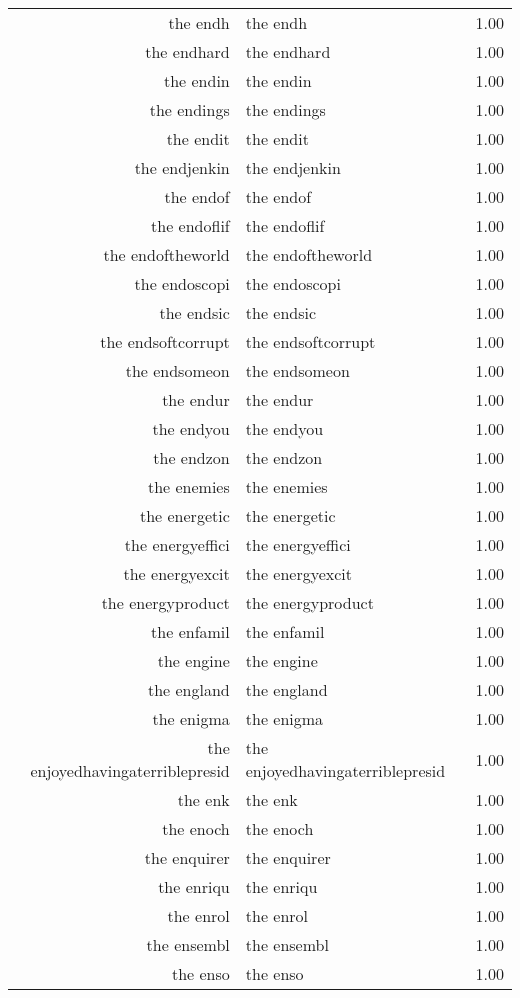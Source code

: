 \begin{table}[ht]
\begin{tabular}{rlr}
  the endh & the endh & 1.00 \\ 
  the endhard & the endhard & 1.00 \\ 
  the endin & the endin & 1.00 \\ 
  the endings & the endings & 1.00 \\ 
  the endit & the endit & 1.00 \\ 
  the endjenkin & the endjenkin & 1.00 \\ 
  the endof & the endof & 1.00 \\ 
  the endoflif & the endoflif & 1.00 \\ 
  the endoftheworld & the endoftheworld & 1.00 \\ 
  the endoscopi & the endoscopi & 1.00 \\ 
  the endsic & the endsic & 1.00 \\ 
  the endsoftcorrupt & the endsoftcorrupt & 1.00 \\ 
  the endsomeon & the endsomeon & 1.00 \\ 
  the endur & the endur & 1.00 \\ 
  the endyou & the endyou & 1.00 \\ 
  the endzon & the endzon & 1.00 \\ 
  the enemies & the enemies & 1.00 \\ 
  the energetic & the energetic & 1.00 \\ 
  the energyeffici & the energyeffici & 1.00 \\ 
  the energyexcit & the energyexcit & 1.00 \\ 
  the energyproduct & the energyproduct & 1.00 \\ 
  the enfamil & the enfamil & 1.00 \\ 
  the engine & the engine & 1.00 \\ 
  the england & the england & 1.00 \\ 
  the enigma & the enigma & 1.00 \\ 
  the enjoyedhavingaterriblepresid & the enjoyedhavingaterriblepresid & 1.00 \\ 
  the enk & the enk & 1.00 \\ 
  the enoch & the enoch & 1.00 \\ 
  the enquirer & the enquirer & 1.00 \\ 
  the enriqu & the enriqu & 1.00 \\ 
  the enrol & the enrol & 1.00 \\ 
  the ensembl & the ensembl & 1.00 \\ 
  the enso & the enso & 1.00 \\ 

\end{tabular}
\end{table}
